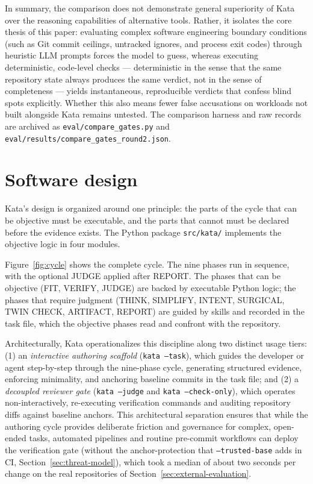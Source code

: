 \documentclass[11pt]{article}
\begin{document}
In summary, the comparison does not demonstrate general superiority of Kata over the reasoning capabilities of alternative tools. Rather, it isolates the core thesis of this paper: evaluating complex software engineering boundary conditions (such as Git commit ceilings, untracked ignores, and process exit codes) through heuristic LLM prompts forces the model to guess, whereas executing deterministic, code-level checks --- deterministic in the sense that the same repository state always produces the same verdict, not in the sense of completeness --- yields instantaneous, reproducible verdicts that confess blind spots explicitly. Whether this also means fewer false accusations on workloads not built alongside Kata remains untested. The comparison harness and raw records are archived as \texttt{eval/compare\_gates.py} and \texttt{eval/results/compare\_gates\_round2.json}.

\section{Software design}
\label{sec:design}

Kata's design is organized around one principle: the parts of the cycle that
can be objective must be executable, and the parts that cannot must be
declared before the evidence exists. The Python package \texttt{src/kata/}
implements the objective logic in four modules.

Figure~\ref{fig:cycle} shows the complete cycle. The nine phases run in
sequence, with the optional JUDGE applied after REPORT. The phases that
can be objective (FIT, VERIFY, JUDGE) are backed by executable Python
logic; the phases that require judgment (THINK, SIMPLIFY, INTENT,
SURGICAL, TWIN CHECK, ARTIFACT, REPORT) are guided by skills and recorded
in the task file, which the objective phases read and confront with the
repository.

Architecturally, Kata operationalizes this discipline along two distinct usage tiers:
(1) an \emph{interactive authoring scaffold} (\texttt{kata --task}), which guides the developer or agent step-by-step through the nine-phase cycle, generating structured evidence, enforcing minimality, and anchoring baseline commits in the task file; and
(2) a \emph{decoupled reviewer gate} (\texttt{kata --judge} and \texttt{kata --check-only}), which operates non-interactively, re-executing verification commands and auditing repository diffs against baseline anchors. This architectural separation ensures that while the authoring cycle provides deliberate friction and governance for complex, open-ended tasks, automated pipelines and routine pre-commit workflows can deploy the verification gate (without the anchor-protection that \texttt{--trusted-base} adds in CI, Section~\ref{sec:threat-model}), which took a median of about two seconds per change on the real repositories of Section~\ref{sec:external-evaluation}.
\end{document}
